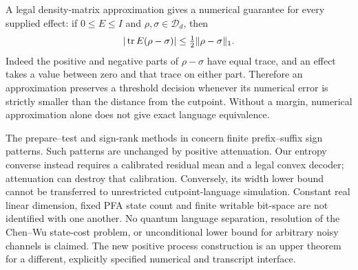 A legal density-matrix approximation gives a numerical guarantee for
every supplied effect: if $0\le E\le I$ and $\rho,\sigma\in\mathcal D_d$,
then
\[
                 |\operatorname{tr} E(\rho-\sigma)|\le\tfrac12\|\rho-\sigma\|_1.
\]
Indeed the positive and negative parts of $\rho-\sigma$ have equal
trace, and an effect takes a value between zero and that trace on
either part. Therefore an approximation preserves a threshold
decision whenever its numerical error is strictly smaller than the
distance from the cutpoint. Without a margin, numerical approximation
alone does not give exact language equivalence.

The prepare--test and sign-rank methods in \cite{CWMay65} concern
finite prefix--suffix sign patterns. Such patterns are unchanged by
positive attenuation. Our entropy converse instead requires a
calibrated residual mean and a legal convex decoder; attenuation can
destroy that calibration. Conversely, its width lower bound cannot
be transferred to unrestricted cutpoint-language simulation. Constant
real linear dimension, fixed PFA state count and finite writable
bit-space are not identified with one another. No quantum language
separation, resolution of the Chen--Wu state-cost problem, or
unconditional lower bound for arbitrary noisy channels is claimed.
The new positive process construction is an upper theorem for a
different, explicitly specified numerical and transcript interface.

